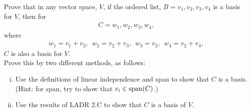 \begin{question}\label{que:GeneralVectorSpaceNewBasisFromOld}
	\normalfont
	
	Prove that in any vector space, $V$, if the ordered list, $B=v_1, v_2, v_3, v_4$ \hspace{.1cm} is a basis for $V$, then for 
	\begin{align*}
		C= w_1, w_2, w_3, w_4 ,
	\end{align*}
	where
	\begin{align*}
		w_1=v_1+v_2,\ \  w_2=v_2+v_3,\ \  w_3=v_2,\ \  w_4=v_2 + v_4,
	\end{align*}
	$C$ is also a basis for $V$.  \\
	
	\noindent Prove this by two different methods, as follows:
	
	\begin{enumerate}[(i)]
		\item Use the definitions of linear independence and span to show that $C$ is a basis. (Hint: for span, try to show that $v_i\in\textnormal{span}(C)$.)
		
		\item Use the results of LADR 2.C to show that $C$ is a basis of $V$.
	\end{enumerate}
\end{question}
